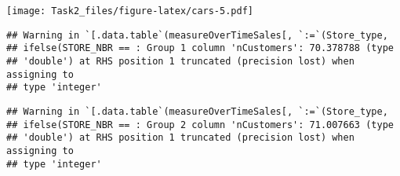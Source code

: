 \documentclass[
]{article}
\newenvironment{Shaded}{\begin{snugshade}}{\end{snugshade}}
\newcommand{\DataTypeTok}[1]{\textcolor[rgb]{0.13,0.29,0.53}{#1}}
\newcommand{\DecValTok}[1]{\textcolor[rgb]{0.00,0.00,0.81}{#1}}
\newcommand{\ErrorTok}[1]{\textcolor[rgb]{0.64,0.00,0.00}{\textbf{#1}}}
\newcommand{\KeywordTok}[1]{\textcolor[rgb]{0.13,0.29,0.53}{\textbf{#1}}}
\newcommand{\NormalTok}[1]{#1}
\newcommand{\OperatorTok}[1]{\textcolor[rgb]{0.81,0.36,0.00}{\textbf{#1}}}
\newcommand{\StringTok}[1]{\textcolor[rgb]{0.31,0.60,0.02}{#1}}
\begin{document}
\texttt{[image: Task2\_files/figure-latex/cars-5.pdf]}

\begin{Shaded}
\end{Shaded}

\begin{verbatim}
## Warning in `[.data.table`(measureOverTimeSales[, `:=`(Store_type,
## ifelse(STORE_NBR == : Group 1 column 'nCustomers': 70.378788 (type
## 'double') at RHS position 1 truncated (precision lost) when assigning to
## type 'integer'
\end{verbatim}

\begin{verbatim}
## Warning in `[.data.table`(measureOverTimeSales[, `:=`(Store_type,
## ifelse(STORE_NBR == : Group 2 column 'nCustomers': 71.007663 (type
## 'double') at RHS position 1 truncated (precision lost) when assigning to
## type 'integer'
\end{verbatim}
\end{document}
